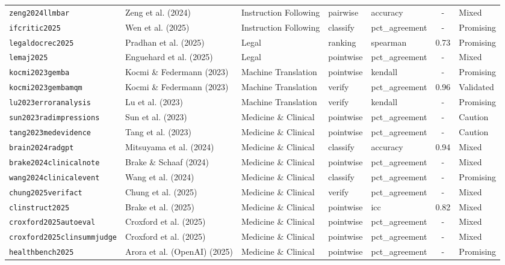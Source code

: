 \begin{longtable}{@{}l l l l l c l@{}}
\texttt{zeng2024llmbar} & Zeng et al. (2024) & Instruction Following & pairwise & accuracy & - & Mixed \\
\texttt{ifcritic2025} & Wen et al. (2025) & Instruction Following & classify & pct\_agreement & - & Promising \\
\texttt{legaldocrec2025} & Pradhan et al. (2025) & Legal & ranking & spearman & 0.73 & Promising \\
\texttt{lemaj2025} & Enguehard et al. (2025) & Legal & pointwise & pct\_agreement & - & Mixed \\
\texttt{kocmi2023gemba} & Kocmi \& Federmann (2023) & Machine Translation & pointwise & kendall & - & Promising \\
\texttt{kocmi2023gembamqm} & Kocmi \& Federmann (2023) & Machine Translation & verify & pct\_agreement & 0.96 & Validated \\
\texttt{lu2023erroranalysis} & Lu et al. (2023) & Machine Translation & verify & kendall & - & Promising \\
\texttt{sun2023radimpressions} & Sun et al. (2023) & Medicine \& Clinical & pointwise & pct\_agreement & - & Caution \\
\texttt{tang2023medevidence} & Tang et al. (2023) & Medicine \& Clinical & pointwise & pct\_agreement & - & Caution \\
\texttt{brain2024radgpt} & Mitsuyama et al. (2024) & Medicine \& Clinical & classify & accuracy & 0.94 & Mixed \\
\texttt{brake2024clinicalnote} & Brake \& Schaaf (2024) & Medicine \& Clinical & pointwise & pct\_agreement & - & Mixed \\
\texttt{wang2024clinicalevent} & Wang et al. (2024) & Medicine \& Clinical & classify & pct\_agreement & - & Promising \\
\texttt{chung2025verifact} & Chung et al. (2025) & Medicine \& Clinical & verify & pct\_agreement & - & Mixed \\
\texttt{clinstruct2025} & Brake et al. (2025) & Medicine \& Clinical & pointwise & icc & 0.82 & Mixed \\
\texttt{croxford2025autoeval} & Croxford et al. (2025) & Medicine \& Clinical & pointwise & pct\_agreement & - & Mixed \\
\texttt{croxford2025clinsummjudge} & Croxford et al. (2025) & Medicine \& Clinical & pointwise & pct\_agreement & - & Mixed \\
\texttt{healthbench2025} & Arora et al. (OpenAI) (2025) & Medicine \& Clinical & pointwise & pct\_agreement & - & Promising \\

\end{longtable}

